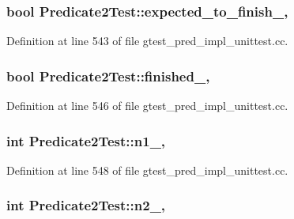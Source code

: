\subsubsection[{\texorpdfstring{expected\+\_\+to\+\_\+finish\+\_\+}{expected_to_finish_}}]{\setlength{\rightskip}{0pt plus 5cm}bool Predicate2\+Test\+::expected\+\_\+to\+\_\+finish\+\_\+\hspace{0.3cm}{\ttfamily [static]}, {\ttfamily [protected]}}\hypertarget{class_predicate2_test_a56cf1f0f556addd9a62e0644dc1a86fc}{}\label{class_predicate2_test_a56cf1f0f556addd9a62e0644dc1a86fc}


Definition at line 543 of file gtest\+\_\+pred\+\_\+impl\+\_\+unittest.\+cc.

\subsubsection[{\texorpdfstring{finished\+\_\+}{finished_}}]{\setlength{\rightskip}{0pt plus 5cm}bool Predicate2\+Test\+::finished\+\_\+\hspace{0.3cm}{\ttfamily [static]}, {\ttfamily [protected]}}\hypertarget{class_predicate2_test_a30f4ef76d3004253078e767e5c653b85}{}\label{class_predicate2_test_a30f4ef76d3004253078e767e5c653b85}


Definition at line 546 of file gtest\+\_\+pred\+\_\+impl\+\_\+unittest.\+cc.

\subsubsection[{\texorpdfstring{n1\+\_\+}{n1_}}]{\setlength{\rightskip}{0pt plus 5cm}int Predicate2\+Test\+::n1\+\_\+\hspace{0.3cm}{\ttfamily [static]}, {\ttfamily [protected]}}\hypertarget{class_predicate2_test_ac002d8e279b24e75906fd19973fc2170}{}\label{class_predicate2_test_ac002d8e279b24e75906fd19973fc2170}


Definition at line 548 of file gtest\+\_\+pred\+\_\+impl\+\_\+unittest.\+cc.

\subsubsection[{\texorpdfstring{n2\+\_\+}{n2_}}]{\setlength{\rightskip}{0pt plus 5cm}int Predicate2\+Test\+::n2\+\_\+\hspace{0.3cm}{\ttfamily [static]}, {\ttfamily [protected]}}\hypertarget{class_predicate2_test_a9dbe5173570b9b911af2df889c287027}{}\label{class_predicate2_test_a9dbe5173570b9b911af2df889c287027}


